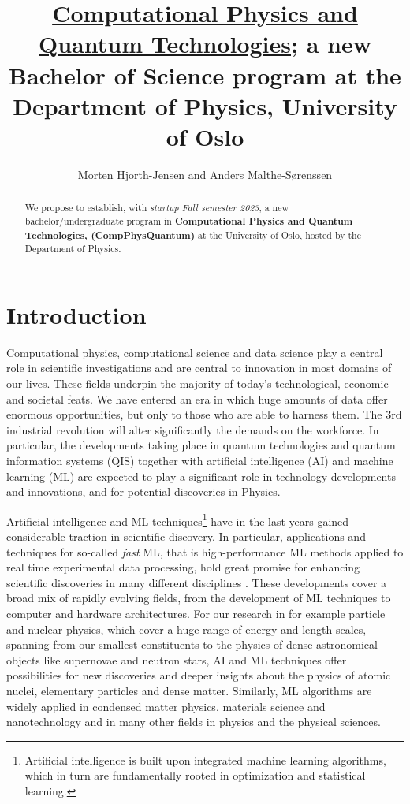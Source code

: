 \documentclass[aps,rmp,preprint,amsmath,amssymb,graphicx,longbibliography]{revtex4-1}
\begin{document}
\title{\underline{Computational Physics and Quantum Technologies}; a new Bachelor of Science program  at the Department of Physics, University of Oslo}

\author{Morten Hjorth-Jensen and Anders Malthe-Sørenssen}


\begin{abstract}
We propose to establish, with {\em startup Fall semester 2023}, a new bachelor/undergraduate program in {\bf Computational Physics and Quantum Technologies, (CompPhysQuantum)}  at the University of Oslo, hosted by the Department of Physics. 
\end{abstract}
\maketitle
\section{Introduction}

Computational physics, computational science  and data science play a central role in scientific investigations and are central to innovation in most domains of our lives. These fields underpin the majority of today's technological, economic and societal feats. We have entered an era in which huge amounts of data offer enormous opportunities, but only to those who are able to harness them. The 3rd industrial revolution will alter significantly the demands on the workforce. In particular, the developments taking place in quantum technologies and quantum information systems (QIS) together with artificial intelligence (AI) and machine learning (ML) are expected to play a significant role in technology developments and innovations, and for potential discoveries in Physics.

Artificial intelligence and ML techniques\footnote{Artificial intelligence is built upon integrated machine learning algorithms, which in turn are fundamentally rooted in optimization and statistical learning.} have in the last years gained considerable traction in scientific discovery. In particular, applications and techniques for so-called {\em fast} ML, that is high-performance ML methods applied to real time experimental data processing, hold great promise for enhancing scientific discoveries in many different disciplines \cite{deiana2021}. 
These developments cover a broad mix of rapidly evolving  fields, from the development of ML techniques to computer and hardware architectures. For our research in for example particle and nuclear physics, which cover a huge range of energy and length scales, spanning from our smallest constituents to the physics of dense astronomical objects like supernovae and neutron stars, AI and ML techniques offer possibilities for new discoveries and deeper insights about the physics of atomic nuclei, elementary particles and dense matter. Similarly, ML algorithms are widely applied  in condensed matter physics, materials science and nanotechnology \cite{Schleder2019} and in many other  fields in physics and the physical sciences.
\end{document}
